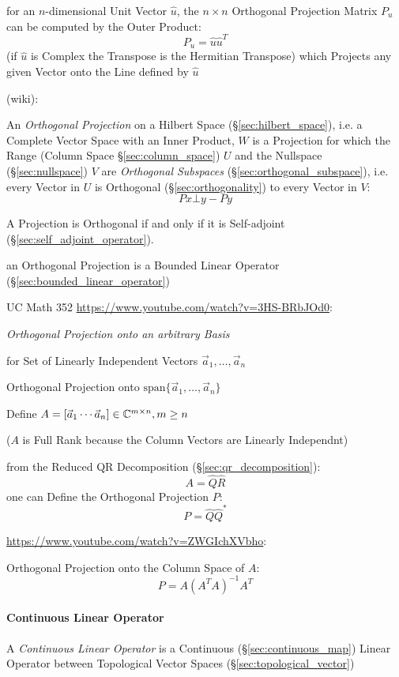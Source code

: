 for an $n$-dimensional Unit Vector $\hat{u}$, the $n \times n$ Orthogonal
Projection Matrix $P_u$ can be computed by the Outer Product:
\[
  P_u = \hat{u}\hat{u}^T
\]
(if $\hat{u}$ is Complex the Transpose is the Hermitian Transpose) which
Projects any given Vector onto the Line defined by $\hat{u}$

(wiki):

An \emph{Orthogonal Projection} on a Hilbert Space (\S\ref{sec:hilbert_space}),
i.e. a Complete Vector Space with an Inner Product,
$W$ is a Projection for which the Range (Column Space \S\ref{sec:column_space})
$U$ and the Nullspace (\S\ref{sec:nullspace}) $V$ are \emph{Orthogonal
  Subspaces} (\S\ref{sec:orthogonal_subspace}), i.e. every Vector in $U$ is
Orthogonal (\S\ref{sec:orthogonality}) to every Vector in $V$:
\[
  Px \bot y - Py
\]

A Projection is Orthogonal if and only if it is Self-adjoint
(\S\ref{sec:self_adjoint_operator}).

an Orthogonal Projection is a Bounded Linear Operator
(\S\ref{sec:bounded_linear_operator})


UC Math 352 \url{https://www.youtube.com/watch?v=3HS-BRbJOd0}:

\emph{Orthogonal Projection onto an arbitrary Basis}

for Set of Linearly Independent Vectors $\vec{a}_1, \ldots, \vec{a}_n$

Orthogonal Projection onto $\mathrm{span}\{\vec{a}_1, \ldots, \vec{a}_n\}$

Define $A = [\vec{a}_1 \cdots \vec{a}_n] \in \mathbb{C}^{m \times n}, m \geq n$

($A$ is Full Rank because the Column Vectors are Linearly Independnt)

from the Reduced QR Decomposition (\S\ref{sec:qr_decomposition}):
\[
  A = \hat{Q}\hat{R}
\]
one can Define the Orthogonal Projection $P$:
\[
  P = \hat{Q}\hat{Q}^*
\]


\url{https://www.youtube.com/watch?v=ZWGIchXVbho}:

Orthogonal Projection onto the Column Space of $A$:
\[
  P = A(A^TA)^{-1}A^T
\]



\paragraph{Continuous Linear Operator}\label{sec:continuous_linear}\hfill

A \emph{Continuous Linear Operator} is a Continuous
(\S\ref{sec:continuous_map}) Linear Operator between Topological
Vector Spaces (\S\ref{sec:topological_vector})

